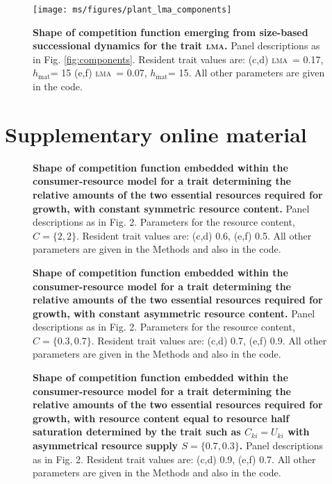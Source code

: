 \documentclass[a4paper,11pt]{article}
\newcommand{\hmat}{\ensuremath{h_{\text{mat}}}}
\newcommand{\lma}{\textsc{lma}}
\begin{document}
\clearpage

\begin{figure}[ht]
 \centering
 \texttt{[image: ms/figures/plant\_lma\_components]}
 \caption{{\bf Shape of competition function emerging from size-based successional dynamics for the trait \lma.} 
 Panel descriptions as in Fig. \ref{fig:components}. Resident trait values are: (c,d) \lma\ = 0.17, \hmat = 15 (e,f) \lma\ = 0.07, \hmat = 15. All other parameters are given in the code.}
 \label{fig:plant_lma}
\end{figure}

\clearpage




\clearpage

\section{Supplementary online material}

\renewcommand{\thefigure}{S\arabic{figure}}
\setcounter{figure}{0}


\begin{figure}[ht]
\caption{{\bf Shape of competition function embedded within the consumer-resource model for a trait determining the relative amounts of the two essential resources required for growth, with constant symmetric resource content.} Panel descriptions as in Fig. 2. Parameters for the resource content, $C = \{2, 2\}$. Resident trait values are: (c,d) 0.6, (e,f) 0.5. All other parameters are given in the Methods and also in the code.}
\end{figure}

\begin{figure}[ht]
 \caption{{\bf Shape of competition function embedded within the consumer-resource model for a trait determining the relative amounts of the two essential resources required for growth, with constant asymmetric resource content.} Panel descriptions as in Fig. 2. Parameters for the resource content, $C = \{0.3, 0.7\}$. Resident trait values are: (c,d) 0.7, (e,f) 0.9. All other parameters are given in the Methods and also in the code.}
\end{figure}

\begin{figure}[ht]
 \caption{{\bf Shape of competition function embedded within the consumer-resource model for a trait determining the relative amounts of the two essential resources required for growth, with resource content equal to resource half saturation determined by the trait such as $C_{ki} = U_{ki}$ with asymmetrical resource supply $S = \{0.7, 0.3\}$.} Panel descriptions as in Fig. 2. Resident trait values are: (c,d) 0.9, (e,f) 0.7. All other parameters are given in the Methods and also in the code.} 
\end{figure}
\end{document}
